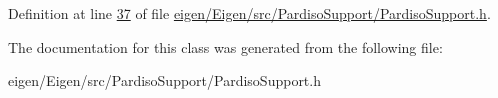 Definition at line \hyperlink{eigen_2_eigen_2src_2_pardiso_support_2_pardiso_support_8h_source_l00037}{37} of file \hyperlink{eigen_2_eigen_2src_2_pardiso_support_2_pardiso_support_8h_source}{eigen/\+Eigen/src/\+Pardiso\+Support/\+Pardiso\+Support.\+h}.



The documentation for this class was generated from the following file\+:\begin{DoxyCompactItemize}
\item 
eigen/\+Eigen/src/\+Pardiso\+Support/\+Pardiso\+Support.\+h\end{DoxyCompactItemize}
